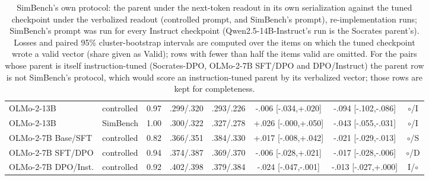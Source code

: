 \begin{table}[t]
\begin{tabular}{@{}llcccccc@{}}
OLMo-2-13B & controlled & 0.97 & .299/.320 & .293/.226 & -.006 [-.034,+.020] & -.094 [-.102,-.086] & $\circ$/I \\
OLMo-2-13B & SimBench & 1.00 & .300/.322 & .327/.278 & +.026 [-.000,+.050] & -.043 [-.055,-.031] & $\circ$/I \\
OLMo-2-7B Base/SFT & controlled & 0.82 & .366/.351 & .384/.330 & +.017 [-.008,+.042] & -.021 [-.029,-.013] & $\circ$/S \\
OLMo-2-7B SFT/DPO & controlled & 0.94 & .374/.387 & .369/.370 & -.006 [-.028,+.021] & -.017 [-.028,-.006] & $\circ$/D \\
OLMo-2-7B DPO/Inst. & controlled & 0.92 & .402/.398 & .379/.384 & -.024 [-.047,-.001] & -.013 [-.027,+.000] & I/$\circ$ \\
\bottomrule
\end{tabular}
\caption{SimBench's own protocol: the parent under the next-token readout in its own serialization against the tuned checkpoint under the verbalized readout (controlled prompt, and SimBench's prompt), re-implementation runs; SimBench's prompt was run for every Instruct checkpoint (Qwen2.5-14B-Instruct's run is the Socrates parent's). Losses and paired 95\% cluster-bootstrap intervals are computed over the items on which the tuned checkpoint wrote a valid vector (share given as Valid); rows with fewer than half the items valid are omitted. For the pairs whose parent is itself instruction-tuned (Socrates-DPO, OLMo-2-7B SFT/DPO and DPO/Instruct) the parent row is not SimBench's protocol, which would score an instruction-tuned parent by its verbalized vector; those rows are kept for completeness.}
\label{tab:simbench-protocol}
\end{table}
